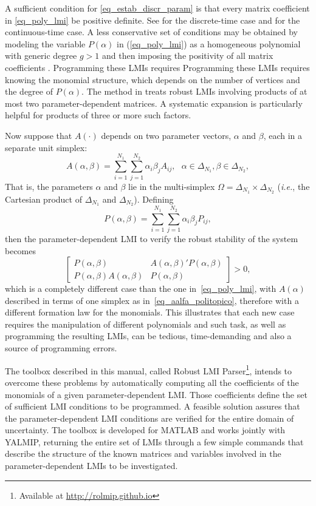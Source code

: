 \documentclass[english,11pt]{article}
\theoremstyle{break} \theorembodyfont{\small\rm}
\begin{document}
A sufficient condition for \eqref{eq_estab_discr_param} is that every
matrix coefficient in \eqref{eq_poly_lmi} be positive definite.
See \cite{RP:01b} for the discrete-time case and \cite{RP:02} for the
continuous-time case.
A less conservative set of conditions
may be obtained by modeling the variable $P(\alpha)$ in (\ref{eq_poly_lmi}) as a
homogeneous polynomial with generic degree $g > 1$ and then imposing the positivity of all
matrix coefficients \cite{OP:06a,BOMP:06b}. Programming these LMIs requires
Programming these LMIs requires knowing the monomial structure, which
depends on the number of vertices and the degree of $P(\alpha)$.
The method in \cite{OP:07a} treats robust LMIs involving products of
at most two parameter-dependent matrices. A systematic expansion is
particularly helpful for products of three or more such factors.

Now suppose that $A(\cdot)$ depends on two parameter vectors,
$\alpha$ and $\beta$, each in a separate unit simplex:
\begin{equation}
 A(\alpha,\beta) = \sum_{i = 1}^{N_1} \sum_{j = 1}^{N_2} \alpha_i \beta_j A_{ij}, ~~~\alpha \in \Delta_{N_1}, \beta \in \Delta_{N_2},
\end{equation}
That is, the parameters $\alpha$ and $\beta$ lie in the multi-simplex $\Omega = \Delta_{N_1} \times \Delta_{N_2}$
(\textit{i.e.}, the Cartesian product of $\Delta_{N_1}$ and
$\Delta_{N_2}$). Defining
\begin{equation}
P(\alpha,\beta) = \sum_{i = 1}^{N_1} \sum_{j = 1}^{N_2} \alpha_i \beta_j P_{ij},
\end{equation}
then the parameter-dependent LMI to verify the robust stability of the system becomes
\begin{equation}
 \begin{bmatrix} P(\alpha,\beta) & A(\alpha,\beta)'P(\alpha,\beta) \\ P(\alpha,\beta)A(\alpha,\beta) & P(\alpha,\beta) \end{bmatrix} > 0,
\end{equation}
which is a completely different case than the one in~\eqref{eq_poly_lmi}, with $A(\alpha)$ described
in terms of one simplex as in~\eqref{eq_aalfa_politopico}, therefore with a different formation law for the monomials.
This illustrates that each new case requires the manipulation of different polynomials and such
task, as well as programming the resulting LMIs, can be tedious, time-demanding and
also a source of programming errors.

The toolbox described in this manual, called Robust LMI Parser\footnote{Available
at \url{http://rolmip.github.io}}, intends to
overcome these problems by automatically computing all the coefficients of the monomials of a given
parameter-dependent LMI. Those coefficients define the set of sufficient LMI conditions to be programmed.
A feasible solution assures that the parameter-dependent LMI conditions are verified for the entire domain of uncertainty.
The toolbox is developed for MATLAB and works jointly with YALMIP,
returning the entire set of LMIs through a few simple commands that describe the
structure of the known matrices and variables involved in the parameter-dependent LMIs to be investigated.
\end{document}
